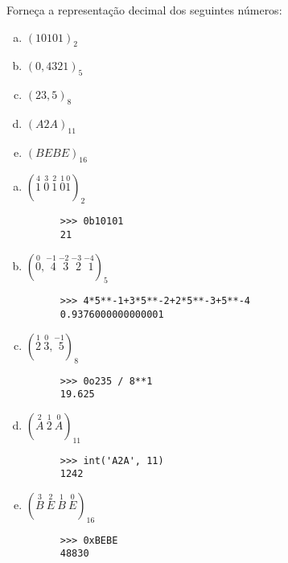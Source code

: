 \begin{exeresol}
  Forneça a representação decimal dos seguintes números:
  \begin{enumerate}[a)]
  \item $(10101)_2$
  \item $(0,4321)_5$
  \item $(23,5)_8$
  \item $(A2A)_{11}$
  \item $(BEBE)_{16}$
  \end{enumerate}
\end{exeresol}
\begin{resol}
  \begin{enumerate}[a)]
  \item $(\stackrel{4}{1}~\stackrel{3}{0}~\stackrel{2}{1}~\stackrel{1}{0}\stackrel{0}{1})_2$
    \ifispython
    \begin{lstlisting}
      >>> 0b10101
      21
    \end{lstlisting}
    \fi
  \item $(\stackrel{0}{0},\stackrel{-1}{~\,4}~\stackrel{-2}{~\,3}~\stackrel{-3}{~\,2}~\stackrel{-4}{~\,1})_5$
    \ifispython
    \begin{lstlisting}
      >>> 4*5**-1+3*5**-2+2*5**-3+5**-4
      0.9376000000000001
    \end{lstlisting}
    \fi
  \item $(\stackrel{1}{2}~\stackrel{0}{3},\stackrel{-1}{~\,5})_8$
    \ifispython
    \begin{lstlisting}
      >>> 0o235 / 8**1
      19.625
    \end{lstlisting}
    \fi    
  \item $(\stackrel{2}{A}~\stackrel{1}{2}~\stackrel{0}{A})_{11}$
    \ifispython
    \begin{lstlisting}
      >>> int('A2A', 11)
      1242
    \end{lstlisting}
    \fi
  \item $(\stackrel{3}{B}~\stackrel{2}{E}~\stackrel{1}{B}~\stackrel{0}{E})_{16}$
    \ifispython
    \begin{lstlisting}
      >>> 0xBEBE
      48830
    \end{lstlisting}
    \fi    
  \end{enumerate}
\end{resol}

